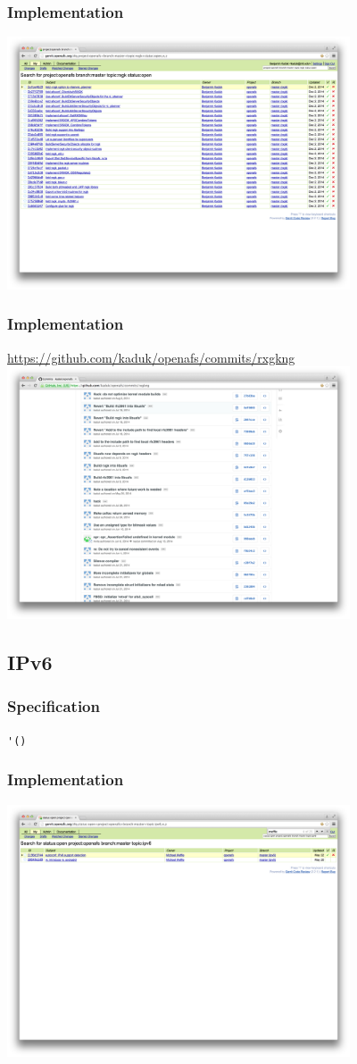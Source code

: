 \documentclass{beamer}
\begin{document}
\begin{frame}
\frametitle{Implementation}
\includegraphics[width=4in]{gerrit-rxgk.png}
\end{frame}

\begin{frame}
\frametitle{Implementation}
\url{https://github.com/kaduk/openafs/commits/rxgkng}
\includegraphics[width=4in]{github-rxgk}
\end{frame}

\subsection{IPv6}

\begin{frame}[fragile,shrink=-50]
\frametitle{Specification}
\verb+'()+
\end{frame}

\begin{frame}
\frametitle{Implementation}
\includegraphics[width=4in]{gerrit-ipv6}
\end{frame}
\end{document}

